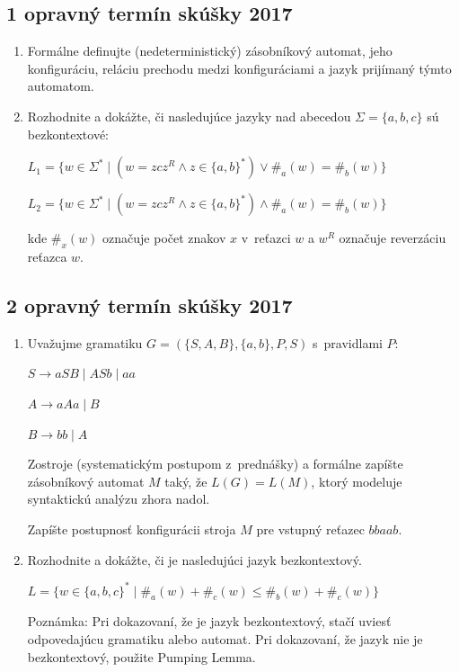 \documentclass[11pt,a4paper]{article}
\begin{document}
		\subsection{1 opravný termín skúšky 2017}

		\begin{enumerate}
			\item Formálne definujte (nedeterministický) zásobníkový automat, jeho konfiguráciu, reláciu prechodu medzi konfiguráciami a jazyk prijímaný týmto automatom.

			\item Rozhodnite a dokážte, či nasledujúce jazyky nad abecedou $\Sigma = \{a,b,c\}$ sú bezkontextové:
	
			$L_1 = \{w \in \Sigma^* \mid (w = zcz^R \land z \in \{a,b\}^*) \lor \#_a(w) = \#_b(w)\}$
	
			$L_2 = \{w \in \Sigma^* \mid (w = zcz^R \land z \in \{a,b\}^*) \land \#_a(w) = \#_b(w)\}$
	
			kde $\#_x(w)$ označuje počet znakov $x$ v~reťazci $w$ a $w^R$ označuje reverzáciu reťazca $w$.
		\end{enumerate}

		\subsection{2 opravný termín skúšky 2017}

		\begin{enumerate}
			\item Uvažujme gramatiku $G = (\{S,A,B\}, \{a,b\}, P, S)$ s~pravidlami $P$:

			$S \rightarrow aSB \mid ASb \mid aa$
	
			$A \rightarrow aAa \mid B$
	
			$B \rightarrow bb \mid A$
	
			Zostroje (systematickým postupom z~prednášky) a formálne zapíšte zásobníkový automat $M$ taký, že $L(G) = L(M)$, ktorý modeluje syntaktickú analýzu zhora nadol.
	
			Zapíšte postupnosť konfigurácii stroja $M$ pre vstupný reťazec $bbaab$.
	
			\item Rozhodnite a dokážte, či je nasledujúci jazyk bezkontextový.
	
			$L = \{w \in \{a,b,c\}^* \mid \#_a(w) + \#_c(w) \leq  \#_b(w) +  \#_c(w)\}$
	
			Poznámka: Pri dokazovaní, že je jazyk bezkontextový, stačí uviesť odpovedajúcu gramatiku alebo automat. Pri dokazovaní, že jazyk nie je bezkontextový, použite Pumping Lemma.
		\end{enumerate}
\end{document}
